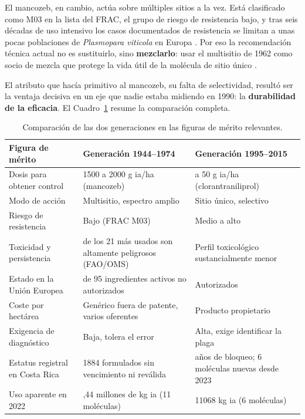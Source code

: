 \documentclass[11pt,letterpaper]{article}
\begin{document}
El mancozeb, en cambio, actúa sobre múltiples sitios a la vez. Está clasificado
como M03 en la lista del FRAC, el grupo de riesgo de resistencia bajo, y tras
seis décadas de uso intensivo los casos documentados de resistencia se limitan a
unas pocas poblaciones de \emph{Plasmopara viticola} en Europa
\parencite{gullino2010,frac2024}. Por eso la recomendación técnica actual no es
sustituirlo, sino \textbf{mezclarlo}: usar el multisitio de 1962 como socio de
mezcla que protege la vida útil de la molécula de sitio único
\parencite{ahdb2023}.

El atributo que hacía primitivo al mancozeb, su falta de selectividad, resultó
ser la ventaja decisiva en un eje que nadie estaba midiendo en 1990: la
\textbf{durabilidad de la eficacia}. El Cuadro~\ref{tab:fom} resume la
comparación completa.

\begin{table}[ht]
  \centering
  \small
  \caption{Comparación de las dos generaciones en las figuras de mérito
  relevantes.}
  \label{tab:fom}
  \begin{tabularx}{\textwidth}{@{}>{\raggedright\arraybackslash}p{}
    >{\raggedright\arraybackslash}X >{\raggedright\arraybackslash}X@{}}
    \toprule
    \textbf{Figura de mérito} & \textbf{Generación 1944--1974}
      & \textbf{Generación 1995--2015} \\
    \midrule
    Dosis para obtener control
      & \num{1500} a \num{2000} g ia/ha (mancozeb)
      & 10 a 50 g ia/ha (clorantraniliprol) \\
    Modo de acción
      & Multisitio, espectro amplio & Sitio único, selectivo \\
    Riesgo de resistencia
      & Bajo (FRAC M03) & Medio a alto \\
    Toxicidad y persistencia
      & 19 de los 21 más usados son altamente peligrosos (FAO/OMS)
      & Perfil toxicológico sustancialmente menor \\
    Estado en la Unión Europea
      & 56 de 95 ingredientes activos no autorizados
      & Autorizados \\
    Coste por hectárea
      & Genérico fuera de patente, varios oferentes
      & Producto propietario \\
    Exigencia de diagnóstico
      & Baja, tolera el error & Alta, exige identificar la plaga \\
    Estatus registral en Costa Rica
      & \num{1884} formulados sin vencimiento ni reválida
      & 21 años de bloqueo; 6 moléculas nuevas desde 2023 \\
    Uso aparente en 2022
      & 6,44 millones de kg ia (11 moléculas)
      & \num{11068} kg ia (6 moléculas) \\
    \bottomrule
  \end{tabularx}
\end{table}
\end{document}
